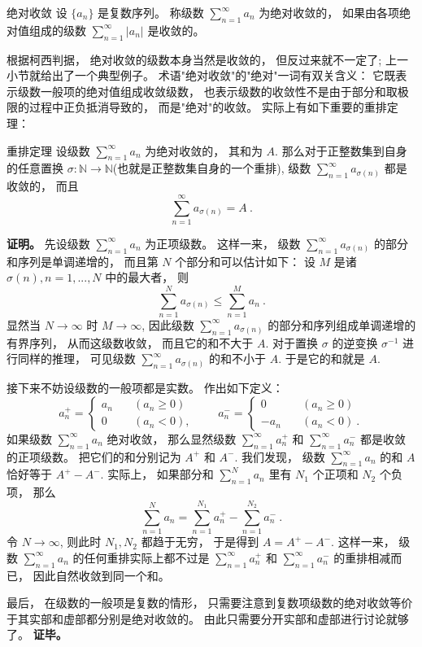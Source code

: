 \begin{definition}{绝对收敛}
设 $\{a_n\}$ 是复数序列。 称级数 $\sum_{n=1}^\infty a_n$ 为绝对收敛的， 如果由各项绝对值组成的级数 $\sum_{n=1}^\infty|a_n|$ 是收敛的。
\end{definition}

根据柯西判据， 绝对收敛的级数本身当然是收敛的， 但反过来就不一定了; 上一小节就给出了一个典型例子。 术语"绝对收敛"的"绝对"一词有双关含义： 它既表示级数一般项的绝对值组成收敛级数， 也表示级数的收敛性不是由于部分和取极限的过程中正负抵消导致的， 而是"绝对"的收敛。 实际上有如下重要的重排定理：

\begin{theorem}{重排定理}
设级数 $\sum_{n=1}^\infty a_n$ 为绝对收敛的， 其和为 $A$. 那么对于正整数集到自身的任意置换 $\sigma:\mathbb{N}\to\mathbb{N}$(也就是正整数集自身的一个重排), 级数 $\sum_{n=1}^\infty a_{\sigma(n)}$ 都是收敛的， 而且
$$
\sum_{n=1}^\infty a_{\sigma(n)}=A~.
$$
\end{theorem}

\textbf{证明。} 先设级数 $\sum_{n=1}^\infty a_n$ 为正项级数。 这样一来， 级数 $\sum_{n=1}^\infty a_{\sigma(n)}$ 的部分和序列是单调递增的， 而且第 $N$ 个部分和可以估计如下： 设 $M$ 是诸 $\sigma(n),n=1,...,N$ 中的最大者， 则
$$
\sum_{n=1}^Na_{\sigma(n)}\leq\sum_{n=1}^{M}a_n~.
$$
显然当 $N\to\infty$ 时 $M\to\infty$, 因此级数 $\sum_{n=1}^\infty a_{\sigma(n)}$ 的部分和序列组成单调递增的有界序列， 从而这级数收敛， 而且它的和不大于 $A$. 对于置换 $\sigma$ 的逆变换 $\sigma^{-1}$ 进行同样的推理， 可见级数 $\sum_{n=1}^\infty a_{\sigma(n)}$ 的和不小于 $A$. 于是它的和就是 $A$.

接下来不妨设级数的一般项都是实数。 作出如下定义：
$$
a_n^+=\left\{\begin{array}{cc}
{a_n}\quad &(a_n\geq0)\\
0\quad &(a_n<0),
\end{array}\right.
\quad\quad
a_n^-=\left\{\begin{array}{cc}
0\quad &(a_n\geq0)~\\
-a_n\quad &(a_n<0)~.
\end{array}\right.
$$
如果级数 $\sum_{n=1}^\infty a_n$ 绝对收敛， 那么显然级数 $\sum_{n=1}^\infty a_n^+$ 和 $\sum_{n=1}^\infty a_n^-$ 都是收敛的正项级数。 把它们的和分别记为 $A^+$ 和 $A^-$. 我们发现， 级数 $\sum_{n=1}^\infty a_n$ 的和 $A$ 恰好等于 $A^+-A^-$. 实际上， 如果部分和 $\sum_{n=1}^N a_n$ 里有 $N_1$ 个正项和 $N_2$ 个负项， 那么
$$
\sum_{n=1}^N a_n=\sum_{n=1}^{N_1} a_n^+-\sum_{n=1}^{N_2} a_n^-~.
$$
令 $N\to\infty$, 则此时 $N_1,N_2$ 都趋于无穷， 于是得到 $A=A^+-A^-$. 这样一来， 级数 $\sum_{n=1}^\infty a_n$ 的任何重排实际上都不过是 $\sum_{n=1}^\infty a_n^+$ 和 $\sum_{n=1}^\infty a_n^-$ 的重排相减而已， 因此自然收敛到同一个和。

最后， 在级数的一般项是复数的情形， 只需要注意到复数项级数的绝对收敛等价于其实部和虚部都分别是绝对收敛的。 由此只需要分开实部和虚部进行讨论就够了。 \textbf{证毕。}
